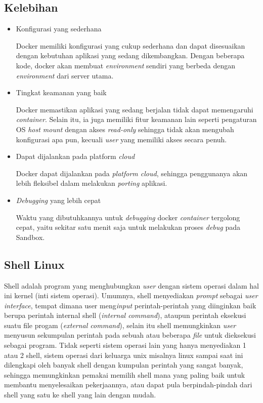 \subsection{Kelebihan}
\begin{itemize}
  \item Konfigurasi yang sederhana
  
  Docker memiliki konfigurasi yang cukup sederhana dan dapat disesuaikan dengan kebutuhan aplikasi yang sedang dikembangkan.
  Dengan beberapa kode, docker akan membuat \textit{environment} sendiri yang berbeda dengan \textit{environment} dari server utama.

  \item Tingkat keamanan yang baik
  
  Docker memastikan aplikasi yang sedang berjalan tidak dapat memengaruhi \textit{container}.
  Selain itu, ia juga memiliki fitur keamanan lain seperti pengaturan OS \textit{host mount} dengan akses \textit{read-only} sehingga tidak akan mengubah konfigurasi apa pun, kecuali \textit{user} yang memiliki akses secara penuh.

  \item Dapat dijalankan pada platform \textit{cloud}
  
  Docker dapat dijalankan pada \textit{platform cloud}, sehingga penggunanya akan lebih fleksibel dalam melakukan \textit{porting} aplikasi.

  \item \textit{Debugging} yang lebih cepat
  
  Waktu yang dibutuhkannya untuk \textit{debugging} docker \textit{container} tergolong cepat, yaitu sekitar satu menit saja untuk melakukan proses \textit{debug} pada Sandbox.

\end{itemize}

\subsection{Shell Linux}

Shell adalah program yang menghubungkan \textit{user} dengan sistem operasi dalam hal ini kernel (inti sistem operasi).
Umumnya, shell menyediakan \textit{prompt} sebagai \textit{user interface}, tempat dimana user meng\textit{input} perintah-perintah yang diinginkan baik berupa perintah internal shell (\textit{internal command}),
ataupun perintah eksekusi suatu file progam (\textit{external command}), selain itu shell memungkinkan \textit{user} menyusun sekumpulan perintah pada sebuah atau beberapa \textit{file} untuk dieksekusi sebagai program.
Tidak seperti sistem operasi lain yang hanya menyediakan 1 atau 2 shell, sistem operasi dari keluarga unix misalnya linux sampai saat ini dilengkapi oleh banyak shell dengan kumpulan perintah yang sangat banyak, sehingga memungkinkan pemakai memilih shell mana yang paling baik untuk membantu menyelesaikan pekerjaannya, atau dapat pula berpindah-pindah dari shell yang satu ke shell yang lain dengan mudah.

